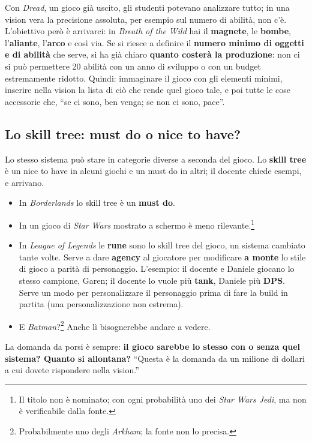 Con \emph{Dread}, un gioco già uscito, gli studenti potevano analizzare
tutto; in una vision vera la precisione assoluta, per esempio sul numero di
abilità, non c'è. L'obiettivo però è arrivarci: in \emph{Breath of the Wild}
hai il \textbf{magnete}, le \textbf{bombe}, l'\textbf{aliante}, l'\textbf{arco}
e così via. Se si riesce a definire il \textbf{numero minimo di oggetti e di
abilità} che serve, si ha già chiaro \textbf{quanto costerà la produzione}:
non ci si può permettere 20 abilità con un anno di sviluppo o con un budget
estremamente ridotto. Quindi: immaginare il gioco con gli elementi minimi,
inserire nella vision la lista di ciò che rende quel gioco tale, e poi tutte
le cose accessorie che, ``se ci sono, ben venga; se non ci sono, pace''.

\subsection{Lo skill tree: must do o nice to have?}

Lo stesso sistema può stare in categorie diverse a seconda del gioco. Lo
\textbf{skill tree} è un nice to have in alcuni giochi e un must do in altri;
il docente chiede esempi, e arrivano.
\begin{itemize}
  \item In \emph{Borderlands} lo skill tree è un \textbf{must do}.
  \item In un gioco di \emph{Star Wars} mostrato a schermo è meno
        rilevante.\footnote{Il titolo non è nominato; con ogni probabilità
        uno dei \emph{Star Wars Jedi}, ma non è verificabile dalla fonte.}
  \item In \emph{League of Legends} le \textbf{rune} sono lo skill tree del
        gioco, un sistema cambiato tante volte. Serve a dare
        \textbf{agency} al giocatore per modificare \textbf{a monte} lo stile
        di gioco a parità di personaggio. L'esempio: il docente e Daniele
        giocano lo stesso campione, Garen; il docente lo vuole più
        \textbf{tank}, Daniele più \textbf{DPS}. Serve un modo per
        personalizzare il personaggio prima di fare la build in partita (una
        personalizzazione non estrema).
  \item E \emph{Batman}?\footnote{Probabilmente uno degli \emph{Arkham};
        la fonte non lo precisa.} Anche lì bisognerebbe andare a vedere.
\end{itemize}
La domanda da porsi è sempre: \textbf{il gioco sarebbe lo stesso con o
senza quel sistema? Quanto si allontana?} ``Questa è la domanda da un milione
di dollari a cui dovete rispondere nella vision.''

